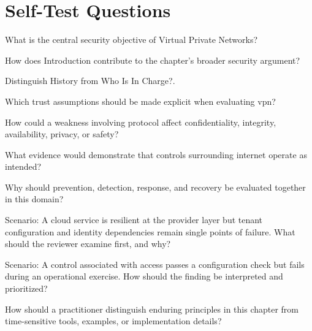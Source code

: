 \documentclass[11pt,letterpaper]{article}
\begin{document}
\section*{Self-Test Questions}
\begin{CornellRecallList}
\item What is the central security objective of Virtual Private Networks?
\item How does Introduction contribute to the chapter's broader security argument?
\item Distinguish History from Who Is In Charge?.
\item Which trust assumptions should be made explicit when evaluating vpn?
\item How could a weakness involving protocol affect confidentiality, integrity, availability, privacy, or safety?
\item What evidence would demonstrate that controls surrounding internet operate as intended?
\item Why should prevention, detection, response, and recovery be evaluated together in this domain?
\item Scenario: A cloud service is resilient at the provider layer but tenant configuration and identity dependencies remain single points of failure. What should the reviewer examine first, and why?
\item Scenario: A control associated with access passes a configuration check but fails during an operational exercise. How should the finding be interpreted and prioritized?
\item How should a practitioner distinguish enduring principles in this chapter from time-sensitive tools, examples, or implementation details?
\end{CornellRecallList}
\end{document}
